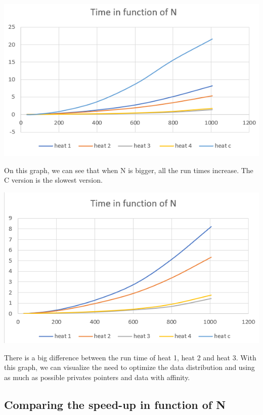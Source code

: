 \documentclass{report}
\begin{document}
\begin{center}
    \includegraphics[scale=1]{Images/time_function_of_N.png}
    \label{fig7}
\end{center}

On this graph, we can see that when N is bigger, all the run times increase. The C version is the slowest version.

\begin{center}
    \includegraphics[scale=1]{Images/time_function_N_no_C.png}
    \label{fig8}
\end{center}

There is a big difference between the run time of heat 1, heat 2 and heat 3. With this graph, we can visualize the need to optimize the data distribution and using as much as possible privates pointers and data with affinity.

\subsection{Comparing the speed-up in function of N}
\end{document}
